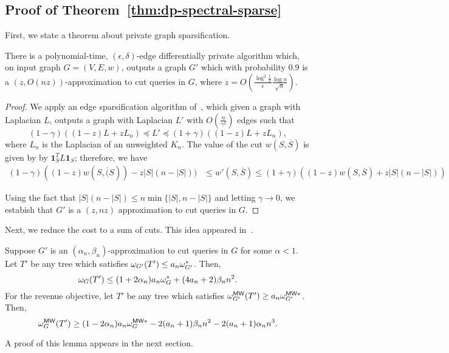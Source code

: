 \subsection{Proof of Theorem~\ref{thm:dp-spectral-sparse}}
First, we state a theorem about private graph sparsification.
\begin{thm}\label{thm:dp-spectral-sparse}
    There is a polynomial-time, $(\epsilon, \delta)$-edge differentially private algorithm which, on input graph $G = (V, E, w)$, outputs a graph $G'$ which with probability $0.9$ is a $(z, O(nz))$-approximation to cut queries in $G$, where $z = O(\frac{\log^2 \frac{1}{\delta}}{\epsilon}\frac{\log n}{\sqrt{n}})$.
\end{thm}
\begin{proof}
We apply an edge sparsification algorithm of~\citet{arora2019differentially}, which given a graph with Laplacian $L$, outputs a graph with Laplacian $L'$ with $O(\frac{n}{\gamma^2})$ edges such that
\[
    (1-\gamma) ((1-z)L + z L_n) \preceq L' \preceq (1+\gamma) ((1-z)L + z L_n),
\]
where $L_n$ is the Laplacian of an unweighted $K_n$. The value of the cut $w(S, \overline{S})$ is given by by $\textbf{1}_S^T L \textbf{1}_S$; therefore, we have
\begin{align*}
    (1-\gamma) ((1-z) w(S, \overline(S)) - z |S|(n-|S|)) &\leq w'(S, \overline{S}) \leq (1+\gamma) ((1-z) w(S, \overline{S}) + z |S|(n-|S|))
\end{align*}

Using the fact that $|S|(n-|S|) \leq n \min \{|S|, n-|S|\}$ and letting $\gamma \rightarrow 0$, we estabish that $G'$ is a $(z, n z)$ approximation to cut queries in $G$.
\end{proof}
Next, we reduce the cost to a sum of cuts. This idea appeared in~\citet{agarwal2022sublinear}. 
\begin{lem}\label{lem:hc-cuts}
    Suppose $G'$ is an $(\alpha_n, \beta_n)$-approximation to cut queries in $G$ for some $\alpha < 1$. Let $T'$ be any tree which satisfies $\omega_{G'}(T') \leq a_n \omega_{G'}^*$. Then,
    \[
        \omega_G(T') \leq (1+2\alpha_n) a_n \omega_G^* + (4a_n + 2) \beta_n n^2.
    \]
    For the revenue objective, let $T'$ be any tree which satisfies $\omega_{G'}^{\textsf{MW}}(T') \geq a_n \omega_{G'}^{\textsf{MW}*}$. Then,
    \[
        \omega_G^{\textsf{MW}}(T') \geq (1-2\alpha_n) a_n \omega_{G}^{\textsf{MW}*} - 2(a_n+1)\beta_n n^2 - 2(a_n+1)\alpha_n n^3.
    \]
\end{lem}
A proof of this lemma appears in the next section.

